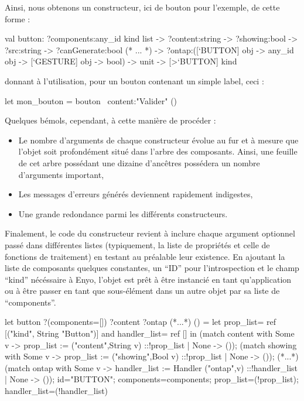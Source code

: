 \documentclass[11pt,a4paper]{report}
\begin{document}
Ainsi, nous obtenons un constructeur, ici de bouton pour l'exemple, de cette forme :

\begin{OCaml}
  val button:
    ?components:any_id kind list
    -> ?content:string
    -> ?showing:bool
    -> ?src:string
    -> ?canGenerate:bool
    (* ... *)
    -> ?ontap:([`BUTTON] obj -> 
               any_id obj -> 
               [`GESTURE] obj -> bool)
    -> unit -> [>`BUTTON] kind
\end{OCaml}

donnant à l'utilisation, pour un bouton contenant un simple label, ceci :

\label{bouton_kind_ex}
\begin{OCaml}
  let mon_bouton = bouton ~content:"Valider" ()
\end{OCaml}

Quelques bémols, cependant, à cette manière de procéder :
\begin{itemize}
\item Le nombre d'arguments de chaque constructeur évolue au fur et à mesure que l'objet
soit profondément situé dans l'arbre des composants. Ainsi, une feuille de cet arbre possédant
une dizaine d'ancêtres possédera un nombre d'arguments important,
\item Les messages d'erreurs générés deviennent rapidement indigestes,
\item Une grande redondance parmi les différents constructeurs.
\end{itemize}

Finalement, le code du constructeur revient à inclure chaque argument optionnel passé dans différentes 
listes (typiquement, la liste de propriétés et celle de fonctions de traitement) en testant
au préalable leur existence.
En ajoutant la liste de composants quelques constantes, un ``ID'' pour l'introspection et 
le champ ``kind'' nécéssaire à Enyo, l'objet est prêt à être instancié en tant qu'application 
ou à être passer en tant que sous-élément dans un autre objet par sa liste de ``components''.

\begin{OCaml}
  let button
      ?(components=[])
      ?content
      ?ontap
      (*...*)
      () =
    let prop_list= ref [("kind", String "Button")]
    and handler_list= ref [] in
    (match content with 
        Some v -> prop_list := ("content",String v)
                               ::!prop_list 
        | None -> ());
    (match showing with 
        Some v -> prop_list := ("showing",Bool v)
                               ::!prop_list 
        | None -> ());
    (*...*)
    (match ontap with 
        Some v -> handler_list := Handler ("ontap",v)
                                  ::!handler_list 
        | None -> ());
    {id="BUTTON"; 
     components=components;
     prop_list=(!prop_list);
     handler_list=(!handler_list)}
\end{OCaml}
\end{document}

